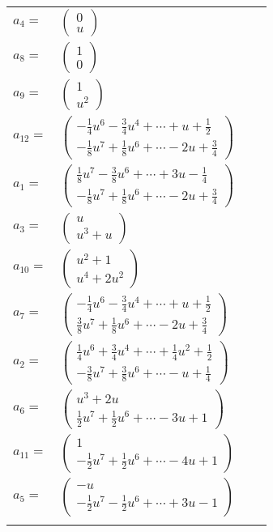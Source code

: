 \documentclass[1p]{elsarticle_modified}
\theoremstyle{definition}
\begin{document}
\begin{tabular}{m{7pt} m{180pt} m{7pt} m{180pt} }
\flushright $a_{4}=$&$\begin{pmatrix}0\\u\end{pmatrix}$ \\
\flushright $a_{8}=$&$\begin{pmatrix}1\\0\end{pmatrix}$ \\
\flushright $a_{9}=$&$\begin{pmatrix}1\\u^2\end{pmatrix}$ \\
\flushright $a_{12}=$&$\begin{pmatrix}-\frac{1}{4} u^6-\frac{3}{4} u^4+\cdots+u+\frac{1}{2}\\-\frac{1}{8} u^7+\frac{1}{8} u^6+\cdots-2 u+\frac{3}{4}\end{pmatrix}$ \\
\flushright $a_{1}=$&$\begin{pmatrix}\frac{1}{8} u^7-\frac{3}{8} u^6+\cdots+3 u-\frac{1}{4}\\-\frac{1}{8} u^7+\frac{1}{8} u^6+\cdots-2 u+\frac{3}{4}\end{pmatrix}$ \\
\flushright $a_{3}=$&$\begin{pmatrix}u\\u^3+u\end{pmatrix}$ \\
\flushright $a_{10}=$&$\begin{pmatrix}u^2+1\\u^4+2 u^2\end{pmatrix}$ \\
\flushright $a_{7}=$&$\begin{pmatrix}-\frac{1}{4} u^6-\frac{3}{4} u^4+\cdots+u+\frac{1}{2}\\\frac{3}{8} u^7+\frac{1}{8} u^6+\cdots-2 u+\frac{3}{4}\end{pmatrix}$ \\
\flushright $a_{2}=$&$\begin{pmatrix}\frac{1}{4} u^6+\frac{3}{4} u^4+\cdots+\frac{1}{4} u^2+\frac{1}{2}\\-\frac{3}{8} u^7+\frac{3}{8} u^6+\cdots- u+\frac{1}{4}\end{pmatrix}$ \\
\flushright $a_{6}=$&$\begin{pmatrix}u^3+2 u\\\frac{1}{2} u^7+\frac{1}{2} u^6+\cdots-3 u+1\end{pmatrix}$ \\
\flushright $a_{11}=$&$\begin{pmatrix}1\\-\frac{1}{2} u^7+\frac{1}{2} u^6+\cdots-4 u+1\end{pmatrix}$ \\
\flushright $a_{5}=$&$\begin{pmatrix}- u\\-\frac{1}{2} u^7-\frac{1}{2} u^6+\cdots+3 u-1\end{pmatrix}$\\&\end{tabular}
\end{document}
